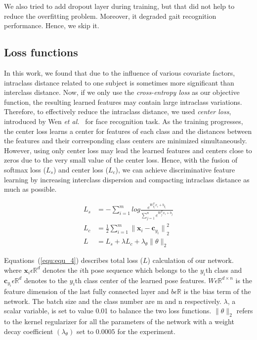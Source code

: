 We also tried to add dropout layer during training, but that did not help to reduce the overfitting problem. Moreover, it degraded gait recognition performance. Hence, we skip it.


\subsection{Loss functions}
In this work, we found that due to the influence of various covariate factors, intraclass distance related to one subject is sometimes more significant than interclass distance. Now, if we only use the \textit{cross-entropy loss} as our objective function, the resulting learned features may contain large intraclass variations. Therefore, to effectively reduce the intraclass distance, we used \textit{center loss}, introduced by Wen \textit{et al.}~\cite{Wen_16} for face recognition task. As the training progresses, the center loss learns a center for features of each class and the distances between the features and their corresponding class centers are minimized simultaneously. However, using only center loss may lead the learned features and centers close to zeros due to the very small value of the center loss. Hence, with the fusion of softmax loss ($L_s$) and center loss ($L_c$), we can achieve discriminative feature learning by increasing interclass dispersion and compacting intraclass distance as much as possible.


\begin{equation}
\label{equ:equ_4}
\begin{split}
L_s &=-\sum_{i=1}^{m}log{\frac{e^{W_{y_i}^{T}x_i + b_{y_i}}}{\sum_{j=1}^{n}{e^{W_{j}^{T}x_i+ b_j}}}} \\
L_c &= \frac{1}{2}\sum_{i=1}^{m}{\parallel{{\boldsymbol x_i}-{\boldsymbol c_{y_i}}}\parallel}_2^2 \\
L &= L_s + \lambda L_c + \lambda_{\theta}\parallel{\theta}\parallel_{2}
\end{split} 
\end{equation}

Equations~(\ref{equ:equ_4}) describes total loss ($ L $) calculation of our network. where $\boldsymbol x_{i} \epsilon \mathbb {R}^d$ denotes the $i$th pose sequence which belongs to the $y_i$th class and  $\boldsymbol c_{y_i} \epsilon \mathbb {R}^d$ denotes to the $y_i$th class center of the learned pose features. $W \epsilon \mathbb {R}^{d\times n}$ is the feature dimension of the last fully connected layer and $b\epsilon \mathbb {R}$ is the bias term of the network. The batch size and the class number are m and n respectively. $\lambda$, a scalar variable, is set to value 0.01 to balance the two loss functions. $\parallel{\theta}\parallel_{2}$ refers to the kernel regularizer for all the parameters of the network with a weight decay coefficient $(\lambda_{\theta})$ set to $0.0005$ for the experiment.  


